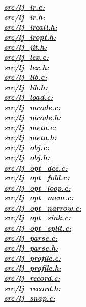 \underline{\textbf{\emph{src/lj\_ir.c:}}}\\
\underline{\textbf{\emph{src/lj\_ir.h:}}}\\
\underline{\textbf{\emph{src/lj\_ircall.h:}}}\\
\underline{\textbf{\emph{src/lj\_iropt.h:}}}\\
\underline{\textbf{\emph{src/lj\_jit.h:}}}\\
\underline{\textbf{\emph{src/lj\_lex.c:}}}\\
\underline{\textbf{\emph{src/lj\_lex.h:}}}\\
\underline{\textbf{\emph{src/lj\_lib.c:}}}\\
\underline{\textbf{\emph{src/lj\_lib.h:}}}\\
\underline{\textbf{\emph{src/lj\_load.c:}}}\\
\underline{\textbf{\emph{src/lj\_mcode.c:}}}\\
\underline{\textbf{\emph{src/lj\_mcode.h:}}}\\
\underline{\textbf{\emph{src/lj\_meta.c:}}}\\
\underline{\textbf{\emph{src/lj\_meta.h:}}}\\
\underline{\textbf{\emph{src/lj\_obj.c:}}}\\
\underline{\textbf{\emph{src/lj\_obj.h:}}}\\
\underline{\textbf{\emph{src/lj\_opt\_dce.c:}}}\\
\underline{\textbf{\emph{src/lj\_opt\_fold.c:}}}\\
\underline{\textbf{\emph{src/lj\_opt\_loop.c:}}}\\
\underline{\textbf{\emph{src/lj\_opt\_mem.c:}}}\\
\underline{\textbf{\emph{src/lj\_opt\_narrow.c:}}}\\
\underline{\textbf{\emph{src/lj\_opt\_sink.c:}}}\\
\underline{\textbf{\emph{src/lj\_opt\_split.c:}}}\\
\underline{\textbf{\emph{src/lj\_parse.c:}}}\\
\underline{\textbf{\emph{src/lj\_parse.h:}}}\\
\underline{\textbf{\emph{src/lj\_profile.c:}}}\\
\underline{\textbf{\emph{src/lj\_profile.h:}}}\\
\underline{\textbf{\emph{src/lj\_record.c:}}}\\
\underline{\textbf{\emph{src/lj\_record.h:}}}\\
\underline{\textbf{\emph{src/lj\_snap.c:}}}\\
